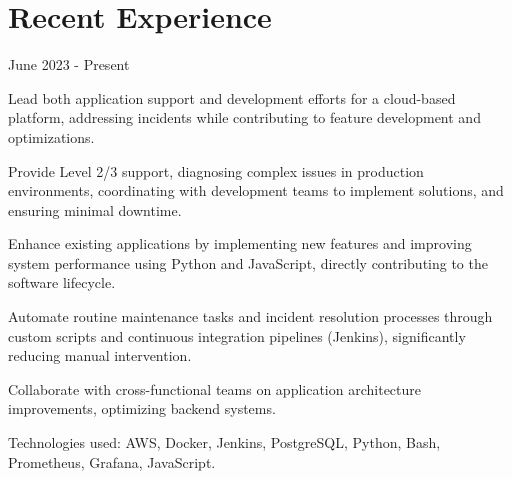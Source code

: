 \section{Recent Experience}

 {June 2023 - Present}
\begin{resume_list}
    \item Lead both application support and development efforts for a cloud-based platform, addressing incidents while contributing to feature development and optimizations.
    \item Provide Level 2/3 support, diagnosing complex issues in production environments, coordinating with development teams to implement solutions, and ensuring minimal downtime.
    \item Enhance existing applications by implementing new features and improving system performance using Python and JavaScript, directly contributing to the software lifecycle.
    \item Automate routine maintenance tasks and incident resolution processes through custom scripts and continuous integration pipelines (Jenkins), significantly reducing manual intervention.
    \item Collaborate with cross-functional teams on application architecture improvements, optimizing backend systems.
    \item Technologies used: AWS, Docker, Jenkins, PostgreSQL, Python, Bash, Prometheus, Grafana, JavaScript.
\end{resume_list}

